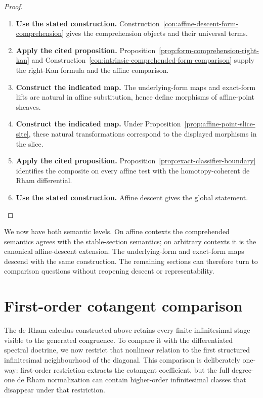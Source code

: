 \begin{proof}
\leavevmode
\begin{enumerate}[label=\textup{(\arabic*)}]
    \item \textbf{Use the stated construction.}
    Construction~\ref{con:affine-descent-form-comprehension} gives the comprehension
    objects and their universal terms.
    \item \textbf{Apply the cited proposition.}
    Proposition~\ref{prop:form-comprehension-right-kan}
    and Construction~\ref{con:intrinsic-comprehended-form-comparison} supply the
    right-Kan formula and the affine comparison.
    \item \textbf{Construct the indicated map.}
    The underlying-form maps and exact-form lifts are natural in affine substitution,
    hence define morphisms of affine-point sheaves.
    \item \textbf{Construct the indicated map.}
    Under
    Proposition~\ref{prop:affine-point-slice-site}, these natural transformations
    correspond to the displayed morphisms in the slice.
    \item \textbf{Apply the cited proposition.}
    Proposition~\ref{prop:exact-classifier-boundary} identifies the composite on
    every affine test with the homotopy-coherent de Rham differential.
    \item \textbf{Use the stated construction.}
    Affine
    descent gives the global statement.
\end{enumerate}
\end{proof}


We now have both semantic levels. On affine contexts the comprehended
semantics agrees with the stable-section semantics; on arbitrary contexts it
is the canonical affine-descent extension. The underlying-form and exact-form
maps descend with the same construction. The remaining sections can therefore
turn to comparison questions without reopening descent or representability.
\section{First-order cotangent comparison}
\label{sec:de-Rham-comparison-reflections}
\label{sec:first-order-linearization}

The de Rham calculus constructed above retains every finite infinitesimal stage
visible to the generated congruence. To compare it with the differentiated
spectral doctrine, we now restrict that nonlinear relation to the first
structured infinitesimal neighbourhood of the diagonal. This comparison is
deliberately one-way: first-order restriction extracts the cotangent
coefficient, but the full degree-one de Rham normalization can contain
higher-order infinitesimal classes that disappear under that restriction.

